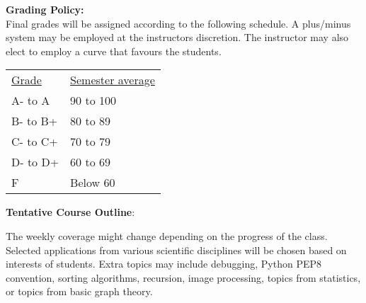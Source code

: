 \documentclass[11pt]{article}
\begin{document}
\textbf {\large Grading Policy:} \\
Final grades will be assigned according to the following schedule. A plus/minus system may be employed at the instructors discretion. The instructor may also elect to employ a curve that favours the students. 
\hspace*{40mm} 
\begin{center}
\begin{tabular}{ l l }
\underline{Grade} & \underline{Semester average} \\
A- to A & 90 to 100 \\
B- to B+ & 80 to 89 \\
C- to C+ & 70 to 79 \\
D- to D+ & 60 to 69 \\
F & Below 60 \\

\end{tabular}
\end{center}


\textbf {\large Tentative Course Outline}:

The weekly coverage might change depending on the progress of the class.  Selected applications from various scientific disciplines will be chosen based on interests of students. Extra topics may include debugging, Python PEP8 convention, sorting algorithms, recursion, image processing, topics from statistics, or topics from basic graph theory.
\end{document}
